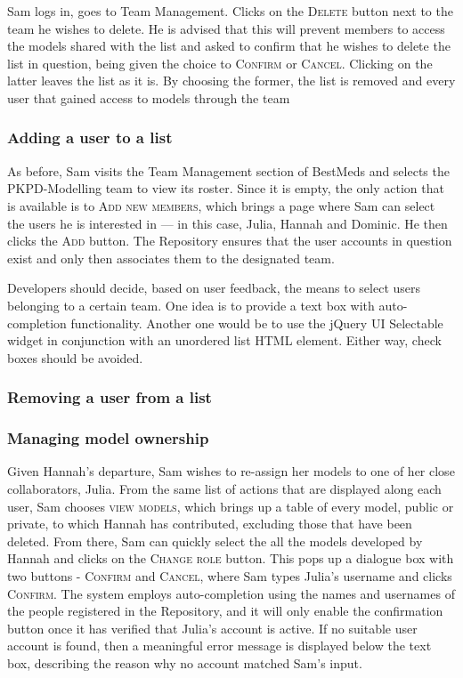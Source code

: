 Sam logs in, goes to Team Management. Clicks on the \textsc{Delete} button next to the team he wishes to delete. He is advised that this will prevent members to access the models shared with the list and asked to confirm that he wishes to delete the list in question, being given the choice to \textsc{Confirm} or \textsc{Cancel}. Clicking on the latter leaves the list as it is. By choosing the former, the list is removed and every user that gained access to models through the team 

\subsubsection{Adding a user to a list}
As before, Sam visits the Team Management section of BestMeds and selects the PKPD-Modelling team to view its roster. Since it is empty, the only action that is available is to \textsc{Add new members}, which brings a page where Sam can select the users he is interested in --- in this case, Julia, Hannah and Dominic. He then clicks the \textsc{Add} button. The Repository ensures that the user accounts in question exist and only then associates them to the designated team.

\begin{techNote}
Developers should decide, based on user feedback, the means to select users belonging to a certain team. One idea is to provide a text box with auto-completion functionality. Another one would be to use the jQuery UI Selectable widget in conjunction with an unordered list HTML element. Either way, check boxes should be avoided.
\end{techNote}

\subsubsection{Removing a user from a list}

\subsubsection{Managing model ownership}
Given Hannah's departure, Sam wishes to re-assign her models to one of her close collaborators, Julia. From the same list of actions that are displayed along each user, Sam chooses \textsc{view models}, which brings up a table of every model, public or private, to which Hannah has contributed, excluding those that have been deleted. From there, Sam can quickly select the all the models developed by Hannah and clicks on the \textsc{Change role} button. This pops up a dialogue box with two buttons - \textsc{Confirm} and \textsc{Cancel}, where Sam types Julia's username and clicks \textsc{Confirm}. The system employs auto-completion using the names and usernames of the people registered in the Repository, and it will only enable the confirmation button once it has verified that Julia's account is active. If no suitable user account is found, then a meaningful error message is displayed below the text box, describing the reason why no account matched Sam's input. 


